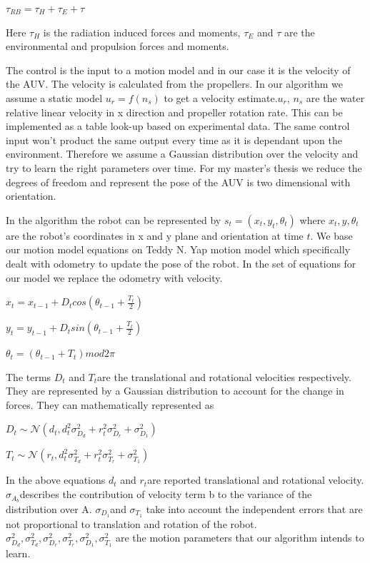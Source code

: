 \documentclass[12pt]{dalcsthesis}
\begin{document}
$\tau_{RB}=\tau_{H}+\tau_{E}+\tau$

Here $\tau_{H}$ is the radiation induced forces and moments, $\tau_{E}$
and $\tau$ are the environmental and propulsion forces and moments.

The control is the input to a motion model and in our case it is the velocity of the AUV. The velocity is calculated from the propellers. In our algorithm we assume a static model $u_{r}=f(n_{s})$ to get a velocity estimate.$u_{r}$, $n_{s}$ are the water relative linear velocity in x direction and propeller rotation rate. This can be implemented as a table look-up based on experimental data.
The same control input won't product the same output every time as it is dependant upon the environment. Therefore we assume a Gaussian distribution over the velocity and try to learn the right parameters over time. 
For my master's thesis we reduce the degrees of freedom and represent the pose of the AUV is two dimensional with orientation. 

In the algorithm the robot can be represented by $s_{t}=(x_{t},y_{t},\theta_{t})$
where $x_{t},y,\theta_{t}$ are the robot's coordinates in x and y
plane and orientation at time $t$. We base our motion model equations on Teddy N. Yap motion model which specifically dealt with odometry to update the pose of the robot. In the set of equations for our model we replace the odometry with velocity. 

$x_{t}=x_{t-1}+D_{t}cos(\theta_{t-1}+\frac{T_{t}}{2})$

$y_{t}=y_{t-1}+D_{t}sin(\theta_{t-1}+\frac{T_{t}}{2})$

$\theta_{t}=(\theta_{t-1}+T_{t})mod2\pi$


The terms $D_{t}$ and $T_{t}$are the translational and rotational
velocities respectively. They are represented by a Gaussian distribution
to account for the change in forces. They can mathematically represented
as 

$D_{t}\sim\mathcal{{N}}(d_{t},d_{t}^{2}\sigma_{D_{d}}^{2}+r_{t}^{2}\sigma_{D_{r}}^{2}+\sigma_{D_{1}}^{2})$

$T_{t}\sim\mathcal{{N}}(r_{t},d_{t}^{2}\sigma_{T_{d}}^{2}+r_{t}^{2}\sigma_{T_{r}}^{2}+\sigma_{T_{1}}^{2})$

In the above equations $d_{t}$ and $r_{t}$are reported translational
and rotational velocity. $\sigma_{A_{b}}$describes the contribution
of velocity term b to the variance of the distribution over A. $\sigma_{D_{1}}$and
$\sigma_{T_{1}}$ take into account the independent errors that are
not proportional to translation and rotation of the robot. $\sigma_{D_{d}}^{2}\ensuremath{,}\sigma_{T_{d}}^{2}\ensuremath{,}\sigma_{D_{r}}^{2}\ensuremath{,}\sigma_{T_{r}}^{2}\ensuremath{,}\sigma_{D_{1}}^{2}\ensuremath{,}\sigma_{T_{1}}^{2}$
are the motion parameters that our algorithm intends to learn. 
 
\end{document}
